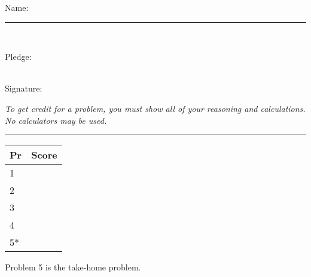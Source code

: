 \documentclass[12pt]{article}
\begin{document}
{\sc Name:} \ \rule{8cm}{.01cm}  \\
\bigskip

{\sc Pledge:}   \hrulefill \\[3mm]
\rule{0cm}{0cm}  \hrulefill \\[3mm]
\hspace*{2in}   {\sc Signature:} \ \hrulefill
\bigskip

{\em To get credit for a problem, you must show all of your reasoning and calculations.  No calculators may be used.}
\bigskip

\rule{6.5in}{1.5pt}

\vspace*{1.5in}

\renewcommand{\arraystretch}{1.5}

\begin{tabular}{l|c}
{\bf Pr} &   {\bf Score}
\\[1mm] \hline
1 &
\\[1mm] \hline
2 &
\\[1mm] \hline
3 &
\\[1mm] \hline
4 &
\\[1mm] \hline
5* &
\\[1mm] \hline
\end{tabular}
\medskip

{\small *Problem 5 is the take-home problem.}

\newpage

\cfoot[\thepage]{\thepage}
\end{document}
